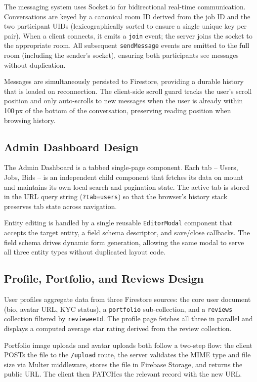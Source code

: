 \documentclass[11pt]{article}
\begin{document}
The messaging system uses Socket.io for bidirectional real-time communication.
Conversations are keyed by a canonical room ID derived from the job ID and the
two participant UIDs (lexicographically sorted to ensure a single unique key per pair).
When a client connects, it emits a \texttt{join} event; the server joins the socket
to the appropriate room. All subsequent \texttt{sendMessage} events are emitted to the
full room (including the sender's socket), ensuring both participants see messages
without duplication.

Messages are simultaneously persisted to Firestore, providing a durable history that
is loaded on reconnection. The client-side scroll guard tracks the user's scroll
position and only auto-scrolls to new messages when the user is already within
100\,px of the bottom of the conversation, preserving reading position when browsing
history.

\subsection{Admin Dashboard Design}

The Admin Dashboard is a tabbed single-page component. Each tab -- Users, Jobs, Bids
-- is an independent child component that fetches its data on mount and maintains its
own local search and pagination state. The active tab is stored in the URL query
string (\texttt{?tab=users}) so that the browser's history stack preserves tab
state across navigation.

Entity editing is handled by a single reusable \texttt{EditorModal} component that
accepts the target entity, a field schema descriptor, and save/close callbacks. The
field schema drives dynamic form generation, allowing the same modal to serve all three
entity types without duplicated layout code.

\subsection{Profile, Portfolio, and Reviews Design}

User profiles aggregate data from three Firestore sources: the core user document (bio,
avatar URL, KYC status), a \texttt{portfolio} sub-collection, and a \texttt{reviews}
collection filtered by \texttt{revieweeId}. The profile page fetches all three in
parallel and displays a computed average star rating derived from the review collection.

Portfolio image uploads and avatar uploads both follow a two-step flow: the client
POSTs the file to the \texttt{/upload} route, the server validates the MIME type and
file size via Multer middleware, stores the file in Firebase Storage, and returns the
public URL. The client then PATCHes the relevant record with the new URL.
\end{document}

